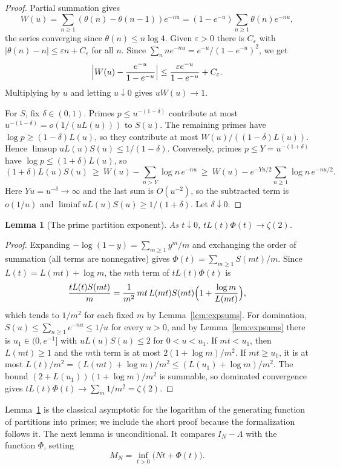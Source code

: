 \documentclass[11pt]{article}
\newtheorem{lemma}[theorem]{Lemma}
\theoremstyle{remark}
\begin{document}
\begin{proof}
Partial summation gives
\[
  W(u)=\sum_{n\ge1}(\theta(n)-\theta(n-1))e^{-nu}
  =(1-e^{-u})\sum_{n\ge1}\theta(n)e^{-nu},
\]
the series converging since $\theta(n)\le n\log4$. Given $\varepsilon>0$ there is $C_\varepsilon$
with $|\theta(n)-n|\le\varepsilon n+C_\varepsilon$ for all $n$. Since
$\sum_nne^{-nu}=e^{-u}/(1-e^{-u})^2$, we get
\[
  \Bigl|W(u)-\frac{e^{-u}}{1-e^{-u}}\Bigr|
  \le\frac{\varepsilon e^{-u}}{1-e^{-u}}+C_\varepsilon .
\]
Multiplying by $u$ and letting $u\downarrow0$ gives $uW(u)\to1$.

For $S$, fix $\delta\in(0,1)$. Primes $p\le u^{-(1-\delta)}$ contribute at
most $u^{-(1-\delta)}=o(1/(uL(u)))$ to $S(u)$. The remaining primes have
$\log p\ge(1-\delta)L(u)$, so they contribute at most
$W(u)/((1-\delta)L(u))$. Hence $\limsup uL(u)S(u)\le1/(1-\delta)$.
Conversely, primes $p\le Y=u^{-(1+\delta)}$ have $\log p\le(1+\delta)L(u)$,
so
\[
  (1+\delta)L(u)S(u)\ \ge\ W(u)-\sum_{n>Y}\log n\,e^{-nu}
  \ \ge\ W(u)-e^{-Yu/2}\sum_{n\ge1}\log n\,e^{-nu/2}.
\]
Here $Yu=u^{-\delta}\to\infty$ and the last sum is $O(u^{-2})$, so the
subtracted term is $o(1/u)$ and $\liminf uL(u)S(u)\ge1/(1+\delta)$. Let
$\delta\downarrow0$.
\end{proof}

\begin{lemma}[The prime partition exponent]\label{lem:phi}
As $t\downarrow0$, $tL(t)\Phi(t)\to\zeta(2)$.
\end{lemma}

\begin{proof}
Expanding $-\log(1-y)=\sum_{m\ge1}y^m/m$ and exchanging the order of
summation (all terms are nonnegative) gives
$\Phi(t)=\sum_{m\ge1}S(mt)/m$. Since $L(t)=L(mt)+\log m$, the $m$th term
of $tL(t)\Phi(t)$ is
\[
  \frac{tL(t)S(mt)}{m}
  =\frac{1}{m^2}\,mt\,L(mt)S(mt)\Bigl(1+\frac{\log m}{L(mt)}\Bigr),
\]
which tends to $1/m^2$ for each fixed $m$ by Lemma~\ref{lem:expsums}.
For domination, $S(u)\le\sum_{n\ge1}e^{-nu}\le1/u$ for every $u>0$, and
by Lemma~\ref{lem:expsums} there is $u_1\in(0,e^{-1}]$ with
$uL(u)S(u)\le2$ for $0<u<u_1$. If $mt<u_1$, then $L(mt)\ge1$ and the $m$th
term is at most $2(1+\log m)/m^2$. If $mt\ge u_1$, it is at most
$L(t)/m^2=(L(mt)+\log m)/m^2\le(L(u_1)+\log m)/m^2$. The bound
$(2+L(u_1))(1+\log m)/m^2$ is summable, so dominated convergence gives
$tL(t)\Phi(t)\to\sum_m1/m^2=\zeta(2)$.
\end{proof}

Lemma~\ref{lem:phi} is the classical asymptotic for the logarithm of
the generating function of partitions into primes; we include the short
proof because the formalization follows it. The next lemma is
unconditional. It compares $I_N-\Lambda$ with the function $\Phi$,
setting
\[
  M_N=\inf_{t>0}\bigl(Nt+\Phi(t)\bigr).
\]
\end{document}
